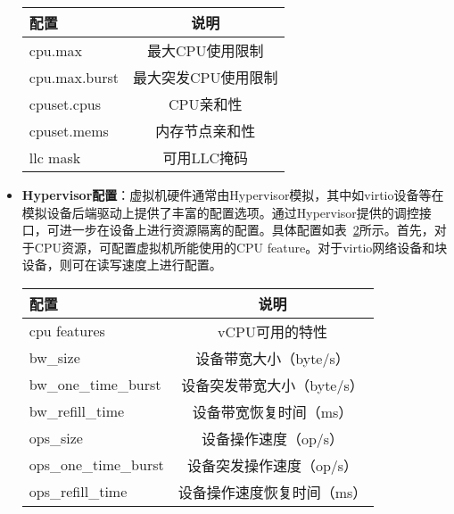 \begin{itemize}
\begin{table}[H]
    \label{tab:cz_cgroup_config}
    \footnotesize%
    \setlength{\tabcolsep}{30pt}%
    \renewcommand{\arraystretch}{1.25}%
    \centering
    \begin{tabular}{lc}
        \hline
        配置 & 说明\\
        \hline
        cpu.max & 最大CPU使用限制 \\
        cpu.max.burst & 最大突发CPU使用限制 \\
        cpuset.cpus & CPU亲和性 \\
        cpuset.mems & 内存节点亲和性 \\
        llc mask& 可用LLC掩码 \\
        \hline
    \end{tabular}
\end{table}

    \item \textbf{Hypervisor配置}：虚拟机硬件通常由Hypervisor模拟，其中如virtio设备等在模拟设备后端驱动上提供了丰富的配置选项。通过Hypervisor提供的调控接口，可进一步在设备上进行资源隔离的配置。具体配置如表~\ref{tab:cz_hv_config}所示。首先，对于CPU资源，可配置虚拟机所能使用的CPU feature。对于virtio网络设备和块设备，则可在读写速度上进行配置。

\begin{table}[H]
    \label{tab:cz_hv_config}
    \footnotesize%
    \setlength{\tabcolsep}{30pt}%
    \renewcommand{\arraystretch}{1.25}%
    \centering
    \begin{tabular}{lc}
        \hline
        配置 & 说明\\
        \hline
        cpu features& vCPU可用的特性\\
        bw\_size & 设备带宽大小（byte/s）\\
        bw\_one\_time\_burst & 设备突发带宽大小（byte/s）\\
        bw\_refill\_time & 设备带宽恢复时间（ms）\\
        ops\_size & 设备操作速度（op/s）\\
        ops\_one\_time\_burst & 设备突发操作速度（op/s）\\
        ops\_refill\_time & 设备操作速度恢复时间（ms）\\
        \hline
    \end{tabular}
\end{table}

\end{itemize}

